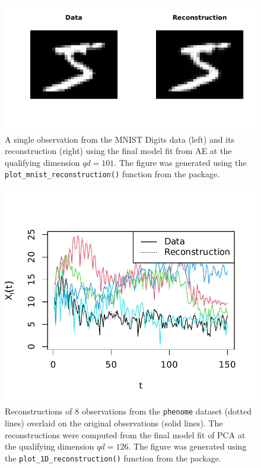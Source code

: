\begin{figure}
    \centering
    \includegraphics[width=0.75\linewidth]{figures/mnist-reconstruction.pdf}
    \caption{A single observation from the MNIST Digits data (left) and its reconstruction (right) using the final model fit from AE at the qualifying dimension $qd = 101$. The figure was generated using the \texttt{plot\_mnist\_reconstruction()} function from the  package.}
    \label{fig:mnist-reconstruction}
\end{figure}

\begin{figure}
    \centering
    \includegraphics[width=0.75\linewidth]{figures/phoneme-reconstruction.pdf}
    \caption{Reconstructions of $8$ observations from the \texttt{phenome} dataset (dotted lines) overlaid on the original observations (solid lines). The reconstructions were computed from the final model fit of PCA at the qualifying dimension $qd=126$. The figure was generated using the \texttt{plot\_1D\_reconstruction()} function from the  package.}
    \label{fig:phoneme-reconstruction}
\end{figure}